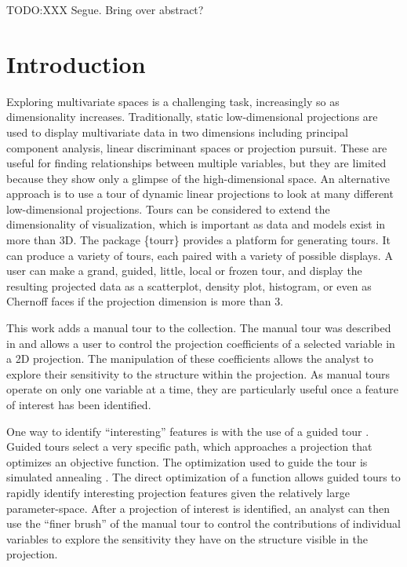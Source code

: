 \documentclass{template/monashthesis}
\begin{document}
TODO:XXX Segue. Bring over abstract?

\hypertarget{introduction}{%
\section{Introduction}\label{introduction}}

Exploring multivariate spaces is a challenging task, increasingly so as dimensionality increases. Traditionally, static low-dimensional projections are used to display multivariate data in two dimensions including principal component analysis, linear discriminant spaces or projection pursuit. These are useful for finding relationships between multiple variables, but they are limited because they show only a glimpse of the high-dimensional space. An alternative approach is to use a tour \autocite{asimov_grand_1985} of dynamic linear projections to look at many different low-dimensional projections. Tours can be considered to extend the dimensionality of visualization, which is important as data and models exist in more than 3D. The package \{tourr\} \autocite{wickham_tourr:_2011} provides a platform for generating tours. It can produce a variety of tours, each paired with a variety of possible displays. A user can make a grand, guided, little, local or frozen tour, and display the resulting projected data as a scatterplot, density plot, histogram, or even as Chernoff faces if the projection dimension is more than 3.

This work adds a manual tour to the collection. The manual tour was described in \textcite{cook_manual_1997} and allows a user to control the projection coefficients of a selected variable in a 2D projection. The manipulation of these coefficients allows the analyst to explore their sensitivity to the structure within the projection. As manual tours operate on only one variable at a time, they are particularly useful once a feature of interest has been identified.

One way to identify ``interesting'' features is with the use of a guided tour \autocite{cook_grand_1995}. Guided tours select a very specific path, which approaches a projection that optimizes an objective function. The optimization used to guide the tour is simulated annealing \autocite{kirkpatrick_optimization_1983}. The direct optimization of a function allows guided tours to rapidly identify interesting projection features given the relatively large parameter-space. After a projection of interest is identified, an analyst can then use the ``finer brush'' of the manual tour to control the contributions of individual variables to explore the sensitivity they have on the structure visible in the projection.
\end{document}
